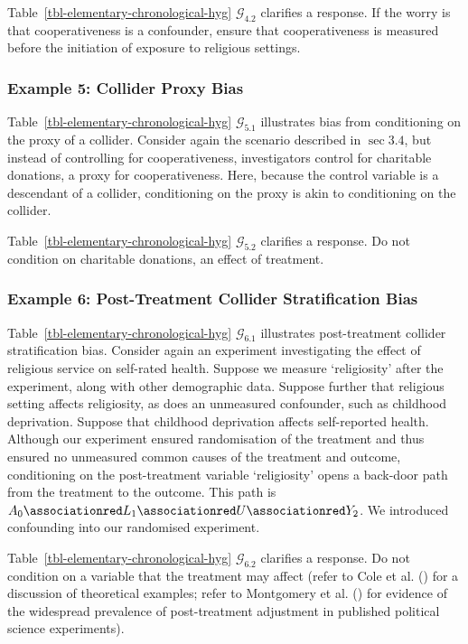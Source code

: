 \documentclass[
  single column]{article}
\begin{document}
Table~\ref{tbl-elementary-chronological-hyg} \(\mathcal{G}_{4.2}\)
clarifies a response. If the worry is that cooperativeness is a
confounder, ensure that cooperativeness is measured before the
initiation of exposure to religious settings.

\subsubsection{Example 5: Collider Proxy
Bias}\label{example-5-collider-proxy-bias}

Table~\ref{tbl-elementary-chronological-hyg} \(\mathcal{G}_{5.1}\)
illustrates bias from conditioning on the proxy of a collider. Consider
again the scenario described in \(\sec 3.4\), but instead of controlling
for cooperativeness, investigators control for charitable donations, a
proxy for cooperativeness. Here, because the control variable is a
descendant of a collider, conditioning on the proxy is akin to
conditioning on the collider.

Table~\ref{tbl-elementary-chronological-hyg} \(\mathcal{G}_{5.2}\)
clarifies a response. Do not condition on charitable donations, an
effect of treatment.

\subsubsection{Example 6: Post-Treatment Collider Stratification
Bias}\label{example-6-post-treatment-collider-stratification-bias}

Table~\ref{tbl-elementary-chronological-hyg} \(\mathcal{G}_{6.1}\)
illustrates post-treatment collider stratification bias. Consider again
an experiment investigating the effect of religious service on
self-rated health. Suppose we measure `religiosity' after the
experiment, along with other demographic data. Suppose further that
religious setting affects religiosity, as does an unmeasured confounder,
such as childhood deprivation. Suppose that childhood deprivation
affects self-reported health. Although our experiment ensured
randomisation of the treatment and thus ensured no unmeasured common
causes of the treatment and outcome, conditioning on the post-treatment
variable `religiosity' opens a back-door path from the treatment to the
outcome. This path is
\(A_0 \associationred L_1 \associationred U \associationred Y_2\). We
introduced confounding into our randomised experiment.

Table~\ref{tbl-elementary-chronological-hyg} \(\mathcal{G}_{6.2}\)
clarifies a response. Do not condition on a variable that the treatment
may affect (refer to Cole et al. () for a
discussion of theoretical examples; refer to Montgomery et al.
() for evidence of the widespread
prevalence of post-treatment adjustment in published political science
experiments).
\end{document}
